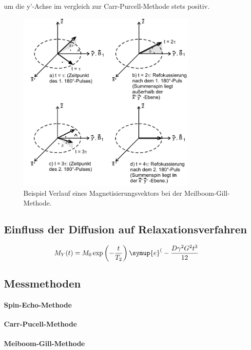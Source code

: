 \begin{itemize}
um die y'-Achse im vergleich zur Carr-Purcell-Methode stets positiv.
\begin{figure}
  \includegraphics[width=0.8\textwidth]{mei-gil.PNG}
  \caption{Beispiel Verlauf eines Magnetisierungsvektors bei
  der Meilboom-Gill-Methode.}
  \label{fig:mei-gil}
\end{figure}
\end{itemize}

\subsection{Einfluss der Diffusion auf Relaxationsverfahren}



\begin{align}
M_Y(t) = M_0\exp\left(-\frac{t}{T_2}\right)
\symup{e}^(-\frac{D\gamma^2 G^2 t^3}{12} \label{}
\end{align}

\subsection{Messmethoden}
\paragraph{Spin-Echo-Methode}
\paragraph{Carr-Pucell-Methode}
\paragraph{Meiboom-Gill-Methode}


\cite{sample}

